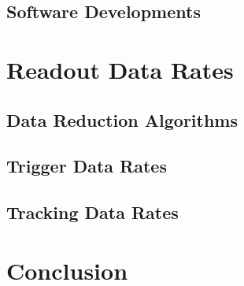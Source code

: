         \subsection{Software Developments}

    \section{Readout Data Rates}

        \subsection{Data Reduction Algorithms}

        \subsection{Trigger Data Rates}

        \subsection{Tracking Data Rates}

    \section{Conclusion}
